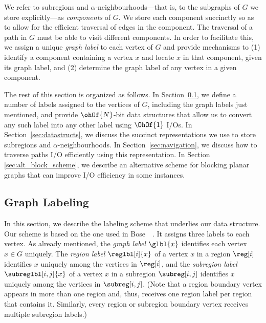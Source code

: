 We refer to subregions and $\alpha$-neighbourhoods---that is, to the
subgraphs of $G$ we store explicitly---as \emph{components} of $G$.
We store each component succinctly so as to allow for the efficient
traversal of edges in the component.
The traversal of a path in $G$ must be able to visit different components.
In order to facilitate this, we assign a unique \emph{graph label} to each vertex of $G$
and provide mechanisms to (1) identify a component containing a vertex $x$ and
locate $x$ in that component, given its graph label, and (2) determine
the graph label of any vertex in a given component.

The rest of this section is organized as follows.
In Section~\ref{sec:graph_labelling}, we define a number of labels
assigned to the vertices of $G$, including the graph labels just
mentioned, and provide $\ohOf{N}$-bit data structures that allow us to
convert any such label into any other label using $\OhOf{1}$ I/Os.
In Section~\ref{sec:datastructs}, we discuss the succinct
representations we use to store subregions and
$\alpha$-neighbourhoods.
In Section~\ref{sec:navigation},
we discuss how to traverse paths I/O efficiently using this
representation.
In Section \ref{sec:alt_block_scheme}, we describe an 
alternative scheme
for blocking planar graphs that can improve I/O efficiency in 
some instances.

\subsection{Graph Labeling}

\label{sec:graph_labelling}

In this section, we describe the labeling scheme that underlies our
data structure.
Our scheme is based on the one used in
Bose~\etal~\cite{DBLP:journals/talg/BoseCHMM12}.
It assigns three labels to each vertex.
As already mentioned, the \emph{graph label} $\glbl{x}$ identifies each vertex
$x \in G$ uniquely.
The \emph{region label} $\reglbl[i]{x}$ of a vertex $x$ in a region $\reg[i]$
identifies $x$ uniquely among the vertices in $\reg[i]$, and the
\emph{subregion label} $\subreglbl[i,j]{x}$ of a vertex $x$ in a subregion
$\subreg[i,j]$ identifies $x$ uniquely
among the vertices in $\subreg[i,j]$.
(Note that a region boundary vertex appears in more than one region and,
thus, receives one region label per region that contains it.
Similarly, every region or subregion boundary vertex receives multiple
subregion labels.)

